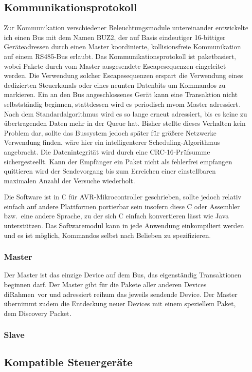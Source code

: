 \documentclass[12pt,a4paper,notitlepage]{article}
\begin{document}
\subsection{Kommunikationsprotokoll}
Zur Kommunikation verschiedener Beleuchtungsmodule untereinander entwickelte ich einen Bus mit dem Namen BUZ2, der auf Basis eindeutiger 16-bittiger Geräteadressen durch einen Master koordinierte, kollisionsfreie Kommunikation auf einem RS485-Bus erlaubt. Das Kommunikationsprotokoll ist paketbasiert, wobei Pakete durch vom Master ausgesendete Escapesequenzen eingeleitet werden. Die Verwendung solcher Escapesequenzen erspart die Verwendung eines dedizierten Steuerkanals oder eines neunten Datenbits um Kommandos zu markieren. Ein an den Bus angeschlossenes Gerät kann eine Transaktion nicht selbstständig beginnen, stattdessen wird es periodisch mvom Master adressiert. Nach dem Standardalgorithmus wird es so lange erneut adressiert, bis es keine zu übertragenden Daten mehr in der Queue hat. Bisher stellte dieses Verhalten kein Problem dar, sollte das Bussystem jedoch später für größere Netzwerke Verwendung finden, wäre hier ein intelligenterer Scheduling-Algorithmus angebracht. Die Datenintegrität wird durch eine CRC-16-Prüfsumme sichergesteellt. Kann der Empfänger ein Paket nicht als fehlerfrei empfangen quittieren wird der Sendevorgang bis zum Erreichen einer einstellbaren maximalen Anzahl der Versuche wiederholt.

Die Software ist in C für AVR-Mikrocontroller geschrieben, sollte jedoch relativ einfach auf andere Plattformen portierbar sein insofern diese C oder Assembler bzw.\ eine andere Sprache, zu der sich C einfach konvertieren lässt wie Java unterstützen. Das Softwaremodul kann in jede Anwendung einkompiliert werden und es ist möglich, Kommandos selbst nach Belieben zu spezifizieren.

\subsubsection{Master}
Der Master ist das einzige Device auf dem Bus, das eigenständig Transaktionen beginnen darf. Der Master gibt für die Pakete aller anderen Devices di\glqq Rahmen\grqq\ vor und adressiert reihum das jeweils sendende Device. Der Master übernimmt zudem die Entdeckung neuer Devices mit einem speziellem Paket, dem \glqq Discovery Packet\grqq.
\subsubsection{Slave}
\subsection{Kompatible Steuergeräte}
\end{document}
